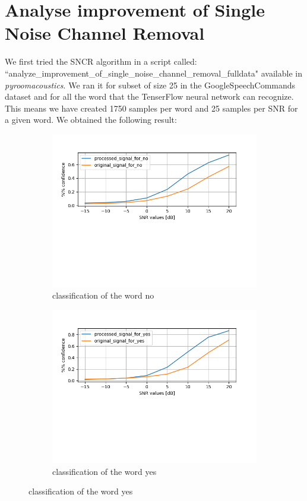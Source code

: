 \documentclass[11pt,a4paper,titlepage]{report}
\begin{document}
\section{Analyse improvement of Single Noise Channel Removal}
\hspace*{0.6cm}
We first tried the SNCR algorithm in a script called:\\ ``analyze\_improvement\_of\_single\_noise\_channel\_removal\_fulldata" available in \textit{pyroomacoustics}. We ran it for subset of size 25 in the GoogleSpeechCommands dataset and for all the word that the TenserFlow neural network can recognize. This means we have created 1750 samples per word and 25 samples per SNR for a given word. We obtained the following result:\\
\begin{figure}[h!]
	\centering
	\begin{subfigure}{.5\textwidth}
		\centering
		\includegraphics[width=0.9\linewidth]{rapport_no_single_noise_channel_removal}
		\caption{classification of the word no}
		\label{fig:sub3}
	\end{subfigure}%
	\begin{subfigure}{.5\textwidth}
		\centering
		\includegraphics[width=0.9\linewidth]{rapport_yes_single_noise_channel_removal}
		\caption{classification of the word yes}
		\label{fig:sub5}
	\end{subfigure}


\end{figure}
\end{document}
